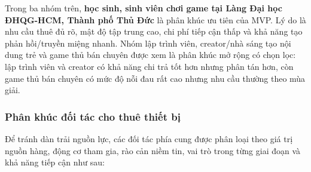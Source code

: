 Trong ba nhóm trên, \textbf{học sinh, sinh viên chơi game tại Làng Đại học ĐHQG-HCM, Thành phố Thủ Đức} là phân khúc ưu tiên của MVP. Lý do là nhu cầu thuê đủ rõ, mật độ tập trung cao, chi phí tiếp cận thấp và khả năng tạo phản hồi/truyền miệng nhanh. Nhóm lập trình viên, creator/nhà sáng tạo nội dung trẻ và game thủ bán chuyên được xem là phân khúc mở rộng có chọn lọc: lập trình viên và creator có khả năng chi trả tốt hơn nhưng phân tán hơn, còn game thủ bán chuyên có mức độ nỗi đau rất cao nhưng nhu cầu thường theo mùa giải.
\subsubsection{Phân khúc đối tác cho thuê thiết bị}

Để tránh dàn trải nguồn lực, các đối tác phía cung được phân loại theo giá trị nguồn hàng, động cơ tham gia, rào cản niềm tin, vai trò trong từng giai đoạn và khả năng tiếp cận như sau:

